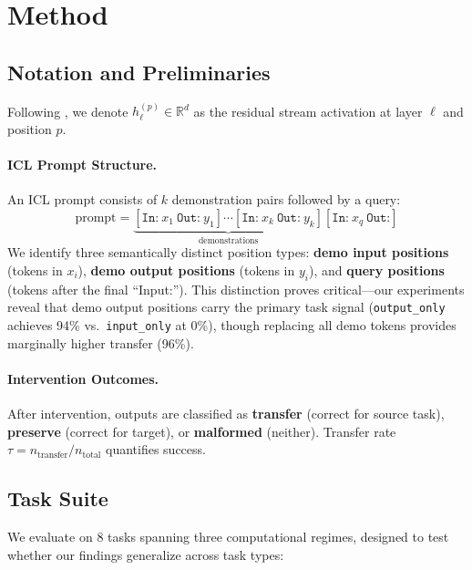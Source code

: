 \documentclass[11pt]{article}
\begin{document}
\section{Method}
\label{sec:method}

\subsection{Notation and Preliminaries}

Following \citet{elhage2021mathematical}, we denote $h_\ell^{(p)} \in \mathbb{R}^d$ as the residual stream activation at layer $\ell$ and position $p$.

\paragraph{ICL Prompt Structure.} An ICL prompt consists of $k$ demonstration pairs followed by a query:
\begin{equation}
    \text{prompt} = \underbrace{[\texttt{In:}~x_1~\texttt{Out:}~y_1] \cdots [\texttt{In:}~x_k~\texttt{Out:}~y_k]}_{\text{demonstrations}} [\texttt{In:}~x_q~\texttt{Out:}]
\end{equation}
We identify three semantically distinct position types: \textbf{demo input positions} (tokens in $x_i$), \textbf{demo output positions} (tokens in $y_i$), and \textbf{query positions} (tokens after the final ``Input:''). This distinction proves critical---our experiments reveal that demo output positions carry the primary task signal (\texttt{output\_only} achieves 94\% vs.\ \texttt{input\_only} at 0\%), though replacing all demo tokens provides marginally higher transfer (96\%).

\paragraph{Intervention Outcomes.} After intervention, outputs are classified as \textbf{transfer} (correct for source task), \textbf{preserve} (correct for target), or \textbf{malformed} (neither). Transfer rate $\tau = n_{\text{transfer}} / n_{\text{total}}$ quantifies success.

\subsection{Task Suite}

We evaluate on 8 tasks spanning three computational regimes, designed to test whether our findings generalize across task types:
\end{document}
